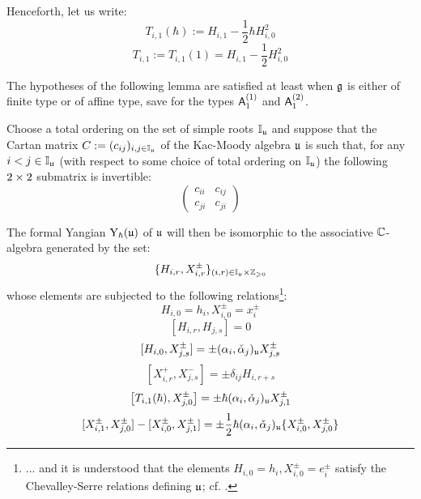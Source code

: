         \begin{convention}
            Henceforth, let us write:
                $$T_{i, 1}(\hbar) := H_{i, 1} - \frac12 \hbar H_{i, 0}^2$$
                $$T_{i, 1} := T_{i, 1}(1) = H_{i, 1} - \frac12 H_{i, 0}^2$$
        \end{convention}
        
        The hypotheses of the following lemma are satisfied at least when $\mathfrak{g}$ is either of finite type or of affine type, save for the types $\mathsf{A}_1^{(1)}$ and $\mathsf{A}_1^{(2)}$.
        \begin{lemma} \label{lemma: levendorskii_presentation}
            \cite[Theorem 2.13]{guay_nakajima_wendlandt_affine_yangian_coproduct} Choose a total ordering on the set of simple roots $\mathbb{I}_{\mathfrak{u}}$ and suppose that the Cartan matrix $C := (c_{ij})_{i, j \in \mathbb{I}_{\mathfrak{u}}}$ of the Kac-Moody algebra $\mathfrak{u}$ is such that, for any $i < j \in \mathbb{I}_{\mathfrak{u}}$ (with respect to some choice of total ordering on $\mathbb{I}_{\mathfrak{u}}$) the following $2 \x 2$ submatrix is invertible:
                $$
                    \begin{pmatrix}
                        c_{ii} & c_{ij}
                        \\
                        c_{ji} & c_{ji}
                    \end{pmatrix}
                $$
            
            The formal Yangian $\mathrm{Y}_{\hbar}(\mathfrak{u})$ of $\mathfrak{u}$ will then be isomorphic to the associative $\mathbb{C}$-algebra generated by the set:
                $$\{ H_{i, r}, X_{i, r}^{\pm} \}_{(i, r) \in \simpleroots_{\fraku} \x \Z_{\geq 0}}$$
            whose elements are subjected to the following relations\footnote{... and it is understood that the elements $H_{i, 0} = h_i, X_{i, 0}^{\pm} = e_i^{\pm}$ satisfy the Chevalley-Serre relations defining $\mathfrak{u}$; cf. \cite[Chapter 1]{kac_infinite_dimensional_lie_algebras}.}:
                $$H_{i, 0} = h_i, X_{i, 0}^{\pm} = x_i^{\pm}$$
                $$[ H_{i, r}, H_{j, s} ] = 0$$
                $$[ H_{i, 0}, X_{j, s}^{\pm} ] = \pm (\alpha_i, \check{\alpha}_j)_{\mathfrak{u}} X_{j, s}^{\pm}$$
                $$[ X_{i, r}^+, X_{j, s}^- ] = \pm \delta_{ij} H_{i, r + s}$$
                $$\left[ T_{i, 1}(\hbar), X_{j, 0}^{\pm} \right] = \pm \hbar (\alpha_i, \check{\alpha}_j)_{\mathfrak{u}} X_{j, 1}^{\pm}$$
                $$[ X_{i, 1}^{\pm}, X_{j, 0}^{\pm} ] - [ X_{i, 0}^{\pm}, X_{j, 1}^{\pm} ] = \pm \frac12 \hbar (\alpha_i, \check{\alpha}_j)_{\mathfrak{u}} \{X_{i, 0}^{\pm}, X_{j, 0}^{\pm}\}$$
        \end{lemma}

